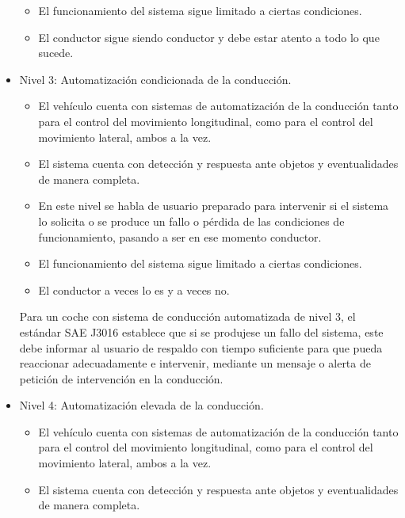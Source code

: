 \documentclass{pclass}
\begin{document}
\begin{itemize}
\begin{itemize}
		\item El funcionamiento del sistema sigue limitado a ciertas condiciones.
		
		\item El conductor sigue siendo conductor y debe estar atento a todo lo que sucede.
	\end{itemize}

	\item Nivel 3: Automatización condicionada de la conducción.
	
	\begin{itemize}
		\item El vehículo cuenta con sistemas de automatización de la conducción tanto para el control del movimiento longitudinal, como para el control del movimiento lateral, ambos a la vez.
		
		\item El sistema cuenta con detección y respuesta ante objetos y eventualidades de manera completa.
		
		\item En este nivel se habla de usuario preparado para intervenir si el sistema lo solicita o se produce un fallo o pérdida de las condiciones de funcionamiento, pasando a ser en ese momento conductor.
		
		\item El funcionamiento del sistema sigue limitado a ciertas condiciones.
		
		\item El conductor a veces lo es y a veces no.
	\end{itemize}

Para un coche con sistema de conducción automatizada de nivel 3, el estándar SAE J3016 establece que si se produjese un fallo del sistema, este debe informar al usuario de respaldo con tiempo suficiente para que pueda reaccionar adecuadamente e intervenir, mediante un mensaje o alerta de petición de intervención en la conducción.

	\item Nivel 4: Automatización elevada de la conducción.
	
	\begin{itemize}
		\item El vehículo cuenta con sistemas de automatización de la conducción tanto para el control del movimiento longitudinal, como para el control del movimiento lateral, ambos a la vez.
		
		\item El sistema cuenta con detección y respuesta ante objetos y eventualidades de manera completa.
		

\end{itemize}
\end{itemize}
\end{document}

